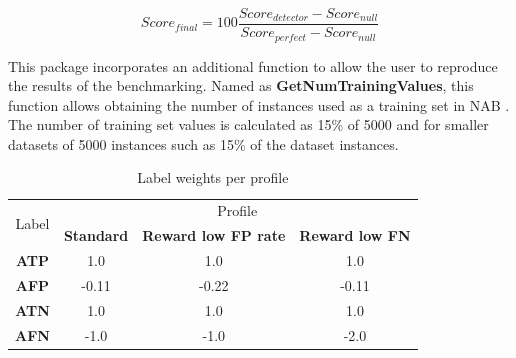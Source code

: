 \documentclass[a4paper]{article}\usepackage[]{graphicx}\usepackage[]{color}
\begin{document}
\begin{equation}\label{eq:eq1}
Score_{final} = 100 \frac{Score_{detector} - Score_{null}}{Score_{perfect} - Score_{null}}
\end{equation}

This package incorporates an additional function to allow the user to reproduce the results of the benchmarking. Named as \textbf{GetNumTrainingValues}, this function allows obtaining the number of instances used as a training set in NAB \cite{7424283}. The number of training set values is calculated as 15\% of 5000 and for smaller datasets of 5000 instances such as 15\% of the dataset instances.


\begin{table}[]
\caption{Label weights per profile}
\label{tab:profile}
\centering
\begin{tabular}{cccc}
\hline
\multirow{2}{*}{Label} & \multicolumn{3}{c}{Profile} \\ \cline{2-4}
 & \textbf{Standard} & \textbf{Reward low FP rate} & \textbf{Reward low FN} \\ \hline
\textbf{ATP} & 1.0 & 1.0 & 1.0 \\ \hline
\textbf{AFP} & -0.11 & -0.22 & -0.11 \\ \hline
\textbf{ATN} & 1.0 & 1.0 & 1.0 \\ \hline
\textbf{AFN} & -1.0 & -1.0 & -2.0 \\ \hline
\end{tabular}
\end{table}
\end{document}
